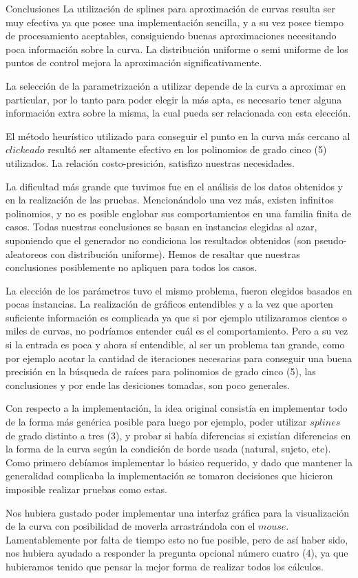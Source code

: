 \begin{section}{Conclusiones}
	La utilización de splines para aproximación de curvas resulta ser muy efectiva ya que posee una implementación sencilla, y a su vez posee tiempo de procesamiento aceptables, consiguiendo buenas aproximaciones necesitando poca información sobre la curva. La distribución uniforme o semi uniforme de los puntos de control mejora la aproximación significativamente.
	
	La selección de la parametrización a utilizar depende de la curva a aproximar en particular, por lo tanto para poder elegir la más apta, es necesario tener alguna información extra sobre la misma, la cual pueda ser relacionada con esta elección.
	
	El método heurístico utilizado para conseguir el punto en la curva más cercano al $clickeado$ resultó ser altamente efectivo en los polinomios de grado cinco (5) utilizados. La relación costo-presición, satisfizo nuestras necesidades.
	
	La dificultad más grande que tuvimos fue en el análisis de los datos obtenidos y en la realización de las pruebas. Mencionándolo una vez más, existen infinitos polinomios, y no es posible englobar sus comportamientos en una familia finita de casos. Todas nuestras conclusiones se basan en instancias elegidas al azar, suponiendo que el generador no condiciona los resultados obtenidos (son pseudo-aleatoreos con distribución uniforme). Hemos de resaltar que nuestras conclusiones posiblemente no apliquen para todos los casos.
	
	La elección de los parámetros tuvo el mismo problema, fueron elegidos basados en pocas instancias. La realización de gráficos entendibles y a la vez que aporten suficiente información es complicada ya que si por ejemplo utilizaramos cientos o miles de curvas, no podríamos entender cuál es el comportamiento. Pero a su vez si la entrada es poca y ahora sí entendible, al ser un problema tan grande, como por ejemplo acotar la cantidad de iteraciones necesarias para conseguir una buena precisión en la búsqueda de raíces para polinomios de grado cinco (5), las conclusiones y por ende las desiciones tomadas, son poco generales.
	
	Con respecto a la implementación, la idea original consistía en implementar todo de la forma más genérica posible para luego por ejemplo, poder utilizar $splines$ de grado distinto a tres (3), y probar si había diferencias si existían diferencias en la forma de la curva según la condición de borde usada (natural, sujeto, etc). Como primero debíamos implementar lo básico requerido, y dado que mantener la generalidad complicaba la implementación se tomaron decisiones que hicieron imposible realizar pruebas como estas.
	
	Nos hubiera gustado poder implementar una interfaz gráfica para la visualización de la curva con posibilidad de moverla arrastrándola con el $mouse$. Lamentablemente por falta de tiempo esto no fue posible, pero de así haber sido, nos hubiera ayudado a responder la pregunta opcional número cuatro (4), ya que hubieramos tenido que pensar la mejor forma de realizar todos los cálculos.
\end{section}
